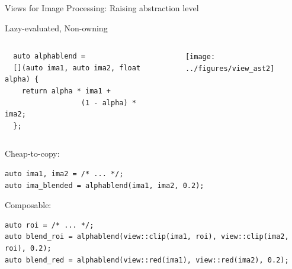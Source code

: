 \documentclass[12pt,aspectratio=169]{beamer}
\begin{document}
\begin{frame}[fragile]{Views for Image Processing: Raising abstraction level}
  \begin{alertblock}{Lazy-evaluated, Non-owning}
    \vspace{0.1cm}
    \begin{columns}[T,onlytextwidth]
      \begin{tcolorbox}
        \begin{verbatim}
  auto alphablend =
  [](auto ima1, auto ima2, float alpha) {
    return alpha * ima1 +
                  (1 - alpha) * ima2;
  };
      \end{verbatim}
      \end{tcolorbox}

      \centering
      \begin{tcolorbox}
        \begin{figure}
          \texttt{[image: ../figures/view\_ast2]}
        \end{figure}
      \end{tcolorbox}

    \end{columns}
  \end{alertblock}

  \begin{alertblock}{Cheap-to-copy:}
    \begin{verbatim}
auto ima1, ima2 = /* ... */;
auto ima_blended = alphablend(ima1, ima2, 0.2);
    \end{verbatim}
  \end{alertblock}

  \begin{alertblock}{Composable:}
    \begin{verbatim}
auto roi = /* ... */;
auto blend_roi = alphablend(view::clip(ima1, roi), view::clip(ima2, roi), 0.2);
auto blend_red = alphablend(view::red(ima1), view::red(ima2), 0.2);
    \end{verbatim}
  \end{alertblock}

\end{frame}
\end{document}

